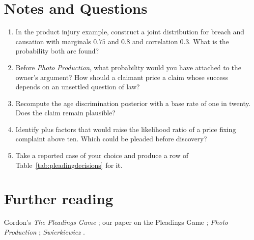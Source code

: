 \section*{Notes and Questions}
\begin{enumerate}[label=\arabic*.]
\item In the product injury example, construct a joint distribution for breach and causation with marginals $0.75$ and $0.8$ and correlation $0.3$. What is the probability both are found?
\item Before \emph{Photo Production}, what probability would you have attached to the owner's argument? How should a claimant price a claim whose success depends on an unsettled question of law?
\item Recompute the age discrimination posterior with a base rate of one in twenty. Does the claim remain plausible?
\item Identify plus factors that would raise the likelihood ratio of a price fixing complaint above ten. Which could be pleaded before discovery?
\item Take a reported case of your choice and produce a row of Table~\ref{tab:pleadingdecisions} for it.
\end{enumerate}

\section*{Further reading}
Gordon's \emph{The Pleadings Game} \citep{gordon1995}; our paper on the Pleadings Game \citep{polson_sokolov_pleadings}; \emph{Photo Production} \citep{photo1980}; \emph{Swierkiewicz} \citep{swierkiewicz2002}.
